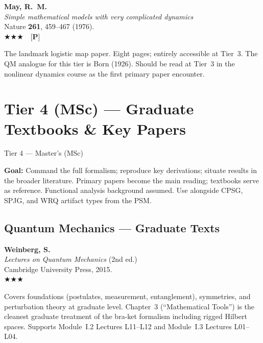 \documentclass[11pt,a4paper]{article}
\newcommand{\essential}{$\bigstar\bigstar\bigstar$}
\newenvironment{bibentry}[1]{%
  \begin{tcolorbox}[entrybox=#1, top=4pt, bottom=4pt]%
}{%
  \end{tcolorbox}\smallskip%
}
\begin{document}
\begin{bibentry}{t3light}
\textbf{May, R.~M.}\\
\textit{Simple mathematical models with very complicated dynamics}\\
Nature \textbf{261}, 459--467 (1976).\\[4pt]
\essential\ \ [\textbf{P}]\\[4pt]
\begin{tcolorbox}[annotbox]
The landmark logistic map paper. Eight pages; entirely accessible at Tier~3.
The QM analogue for this tier is Born (1926). Should be read at Tier~3 in the
nonlinear dynamics course as the first primary paper encounter.
\end{tcolorbox}
\end{bibentry}

\newpage
\section{Tier 4 (MSc) --- Graduate Textbooks \& Key Papers}
\label{sec:t4}

\begin{tcolorbox}[tierheader=t4orange]
Tier 4 --- Master's (MSc)
\end{tcolorbox}

\medskip
\begin{tcolorbox}[keybox]
\textbf{Goal:} Command the full formalism; reproduce key derivations; situate results
in the broader literature. Primary papers become the main reading; textbooks serve
as reference. Functional analysis background assumed. Use alongside CPSG, SPJG,
and WRQ artifact types from the PSM.
\end{tcolorbox}

\subsection{Quantum Mechanics --- Graduate Texts}

\begin{bibentry}{t4light}
\textbf{Weinberg, S.}\\
\textit{Lectures on Quantum Mechanics} (2nd ed.)\\
Cambridge University Press, 2015.\\[4pt]
\essential\\[4pt]
\begin{tcolorbox}[annotbox]
Covers foundations (postulates, measurement, entanglement), symmetries, and
perturbation theory at graduate level. Chapter~3 (``Mathematical Tools'') is the
cleanest graduate treatment of the bra-ket formalism including rigged Hilbert spaces.
Supports Module~I.2 Lectures L11--L12 and Module~I.3 Lectures L01--L04.
\end{tcolorbox}
\end{bibentry}
\end{document}
